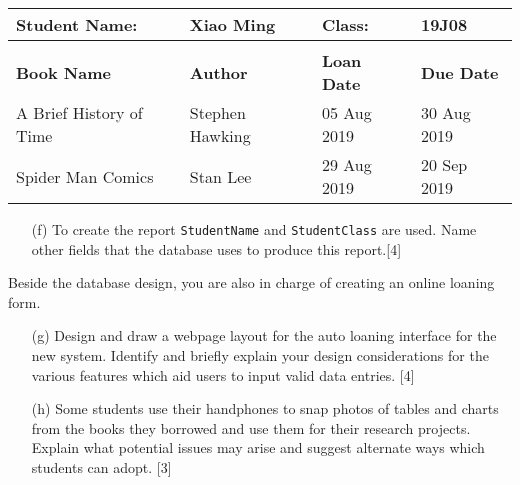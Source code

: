 \begin{tabular}{|l|l|l|l|}
\hline 
\textbf{Student Name:} & Xiao Ming  & \textbf{Class: } & 19J08\tabularnewline
\hline 
 &  &  & \tabularnewline
\hline 
\textbf{Book Name} & \textbf{Author} & \textbf{Loan Date} & \textbf{Due Date}\tabularnewline
\hline 
A Brief History of Time & Stephen Hawking & 05 Aug 2019 & 30 Aug 2019\tabularnewline
\hline 
Spider Man Comics & Stan Lee & 29 Aug 2019 & 20 Sep 2019\tabularnewline
\hline 
\end{tabular}
\begin{enumerate}
\item[(f)]  To create the report \texttt{StudentName} and \texttt{StudentClass}
are used. Name other fields that the database uses to produce this
report.\hfill{}{[}4{]}
\end{enumerate}
Beside the database design, you are also in charge of creating an
online loaning form.
\begin{enumerate}
\item[(g)]  Design and draw a webpage layout for the auto loaning interface
for the new system. Identify and briefly explain your design considerations
for the various features which aid users to input valid data entries.
\hfill{}{[}4{]}
\item[(h)]  Some students use their handphones to snap photos of tables and
charts from the books they borrowed and use them for their research
projects. Explain what potential issues may arise and suggest alternate
ways which students can adopt.\hfill{} {[}3{]}
\end{enumerate}